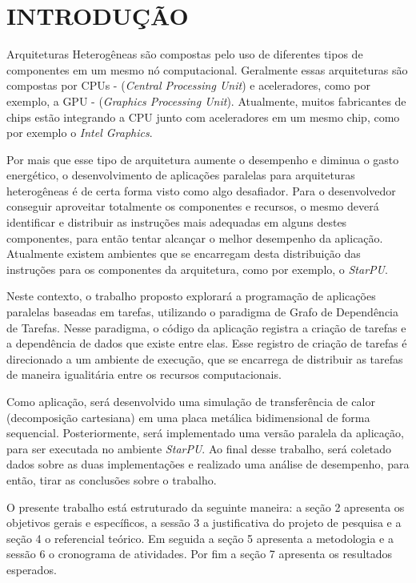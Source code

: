 
\chapter{INTRODUÇÃO}
\label{chap:introducao}

Arquiteturas Heterogêneas são compostas pelo uso de diferentes tipos de componentes em um mesmo nó computacional. Geralmente essas arquiteturas são compostas por CPUs - (\emph{Central Processing Unit}) e aceleradores, como por exemplo, a GPU - (\emph{Graphics Processing Unit}). Atualmente, muitos fabricantes de chips estão integrando a CPU junto com aceleradores em um mesmo chip, como por exemplo o \emph{Intel Graphics}. 

Por mais que esse tipo de arquitetura aumente o desempenho e diminua o gasto energético, o desenvolvimento de aplicações paralelas para arquiteturas heterogêneas é de certa forma visto como algo desafiador. Para o desenvolvedor conseguir aproveitar totalmente os componentes e recursos, o mesmo deverá identificar e distribuir as instruções mais adequadas em alguns destes componentes, para então tentar alcançar o melhor desempenho da aplicação. Atualmente existem ambientes que se encarregam desta distribuição das instruções para os componentes da arquitetura, como por exemplo, o \emph{StarPU}.

Neste contexto, o trabalho proposto explorará a programação de aplicações paralelas baseadas em tarefas, utilizando o paradigma de Grafo de Dependência de Tarefas. Nesse paradigma, o código da aplicação registra a criação de tarefas e a dependência de dados que existe entre elas. Esse registro de criação de tarefas é direcionado a um ambiente de execução, que se encarrega de distribuir as tarefas de maneira igualitária entre os recursos computacionais.

Como aplicação, será desenvolvido uma simulação de transferência de calor (decomposição cartesiana) em uma placa metálica bidimensional de forma sequencial. Posteriormente, será implementado uma versão paralela da aplicação, para ser executada no ambiente \emph{StarPU}. Ao final desse trabalho, será coletado dados sobre as duas implementações e realizado uma análise de desempenho, para então, tirar as conclusões sobre o trabalho.

O presente trabalho está estruturado da seguinte maneira: a seção 2 apresenta os objetivos gerais e específicos, a sessão 3 a justificativa do projeto de pesquisa e a seção 4 o referencial teórico. Em seguida a seção 5 apresenta a metodologia e a sessão 6 o cronograma de atividades. Por fim a seção 7 apresenta os resultados esperados.